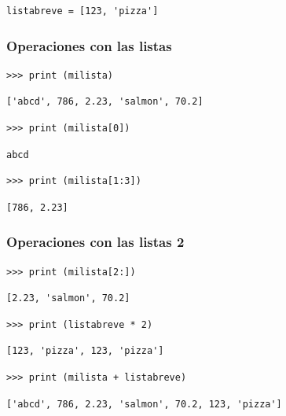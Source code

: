 {\begin{frame}[fragile]
\begin{verbatim}
listabreve = [123, 'pizza']
\end{verbatim}
\end{frame}
\begin{frame}[fragile]
\frametitle{Operaciones con las listas}
\begin{verbatim}
>>> print (milista)
\end{verbatim}
\pause
\begin{verbatim}
['abcd', 786, 2.23, 'salmon', 70.2]
\end{verbatim}
\pause
\begin{verbatim}
>>> print (milista[0])
\end{verbatim}
\pause
\begin{verbatim}
abcd
\end{verbatim}
\pause
\begin{verbatim}
>>> print (milista[1:3])
\end{verbatim}
\pause
\begin{verbatim}
[786, 2.23]
\end{verbatim}
\end{frame}
\begin{frame}[fragile]
\frametitle{Operaciones con las listas 2}
\begin{verbatim}
>>> print (milista[2:])
\end{verbatim}
\pause
\begin{verbatim}
[2.23, 'salmon', 70.2]
\end{verbatim}
\pause
\begin{verbatim}
>>> print (listabreve * 2)
\end{verbatim}
\pause
\begin{verbatim}
[123, 'pizza', 123, 'pizza']
\end{verbatim}
\pause
\begin{verbatim}
>>> print (milista + listabreve)
\end{verbatim}
\pause
\begin{verbatim}
['abcd', 786, 2.23, 'salmon', 70.2, 123, 'pizza']
\end{verbatim}
\end{frame}
}
